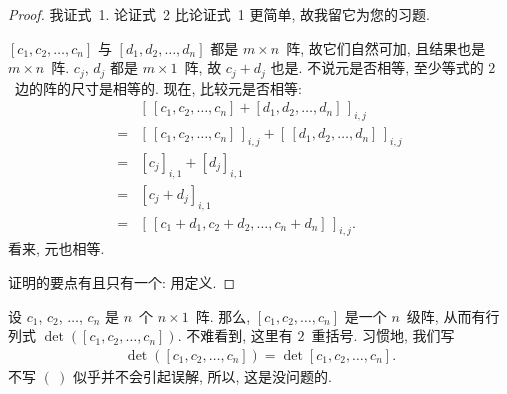 \documentclass[../libro.tex]{subfiles}
\begin{document}
\begin{proof}
    我证式~1.
    论证式~2 比论证式~1 更简单,
    故我留它为您的习题.

    \([c_1, c_2, \dots, c_n]\)
    与 \([d_1, d_2, \dots, d_n]\)
    都是 \(m \times n\)~阵,
    故它们自然可加,
    且结果也是 \(m \times n\)~阵.
    \(c_j\), \(d_j\) 都是 \(m \times 1\)~阵,
    故 \(c_j + d_j\) 也是.
    不说元是否相等, 至少等式的 \(2\)~边的阵的尺寸是相等的.
    现在, 比较元是否相等:
    \begin{align*}
        {}   & [\, [c_1, c_2, \dots, c_n]
        + [d_1, d_2, \dots, d_n] \,]_{i,j}          \\
        = {} & [\, [c_1, c_2, \dots, c_n] \,]_{i,j}
        + [\, [d_1, d_2, \dots, d_n] \,]_{i,j}      \\
        = {} & [c_j]_{i,1} + [d_j]_{i,1}            \\
        = {} & [c_j + d_j]_{i,1}                    \\
        = {} & [\, [c_1 + d_1, c_2 + d_2, \dots,
        c_n + d_n] \,]_{i,j}.
    \end{align*}
    看来, 元也相等.

    证明的要点有且只有一个: 用定义.
\end{proof}

设 \(c_1\), \(c_2\), \(\dots\), \(c_n\) 是
\(n\)~个 \(n \times 1\)~阵.
那么,
\([c_1, c_2, \dots, c_n]\) 是一个 \(n\)~级阵,
从而有行列式 \(\det {([c_1, c_2, \dots, c_n])}\).
不难看到, 这里有 \(2\)~重括号.
习惯地, 我们写
\begin{align*}
    \det {([c_1, c_2, \dots, c_n])}
    =
    \det {[c_1, c_2, \dots, c_n]}.
\end{align*}
不写 \(( \ )\) 似乎并不会引起误解,
所以, 这是没问题的.
\end{document}
